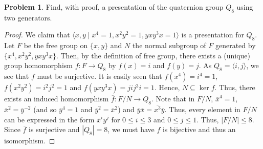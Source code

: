 \documentclass[11pt]{article}
\theoremstyle{definition}
\newtheorem{problem}{Problem}
\begin{document}
    
    
    
    
    
    \newpage 
    
    
    \begin{problem}
    Find, with proof, a presentation of the quaternion group $Q_8$ using two generators.
    \end{problem}
    
    
    \begin{proof}
    We claim that $\langle x, y \mid x^4=1, x^2y^2=1, yxy^3x=1\rangle$ is a presentation for $Q_8$.  Let $F$ be the free group on $\{x,y\}$ and $N$ the normal subgroup of $F$ generated by $\{x^4, x^2y^2, yxy^3x\}$.  Then, by the definition of free group, there exists a (unique) group homomorphism $f:F\to Q_8$ by $f(x)=i$ and $f(y)=j$.  As $Q_8=\langle i,j\rangle$, we see that $f$ must be surjective.  It is easily seen that $f(x^4)=i^4=1$, $f(x^2y^2)=i^2j^2=1$ and $f(yxy^3x)=jij^3i=1$.
Hence, $N\subseteq \ker f$.  Thus, there exists an induced homomorphism $\overline{f}:F/N\to Q_8$.  Note that in $F/N$, $\overline{x}^4=1$, $\overline{x}^2=\overline{y}^{-2}$ (and so $\overline{y}^4=1$ and $\overline{y}^2=\overline{x}^2$) and $\overline{y}\overline{x}=\overline{x^3}\overline{y}$.  Thus, every element in $F/N$ can be expressed in the form $\overline{x}^i\overline{y}^j$ for $0\le i\le 3$ and $0\le j\le 1$.  Thus, $|F/N|\le 8$.  Since $\overline{f}$ is surjective and $|Q_8|=8$, we must have $f$ is bijective and thus an isomorphism.
\end{proof}
\end{document}
